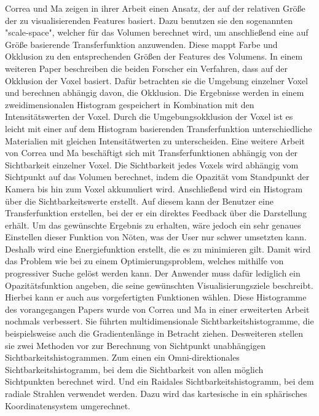 Correa und Ma zeigen in ihrer Arbeit \cite{correa2008size} einen Ansatz, der auf der relativen Größe der zu visualisierenden Features basiert.
\newline
Dazu benutzen sie den sogenannten "scale-space", welcher für das Volumen berechnet wird, um anschließend eine auf Größe basierende Transferfunktion anzuwenden. Diese mappt Farbe und Okklusion zu den entsprechenden Größen der Features des Volumens.
\newline
In einem weiteren Paper \cite{correa2009occlusion} beschreiben die beiden Forscher ein Verfahren, dass auf der Okklusion der Voxel basiert.
\newline
Dafür betrachten sie die Umgebung einzelner Voxel und berechnen abhängig davon, die Okklusion. Die Ergebnisse werden in einem zweidimensionalen Histogram gespeichert in Kombination mit den Intensitätswerten der Voxel. Durch die Umgebungsokklusion der Voxel ist es leicht mit einer auf dem Histogram basierenden Transferfunktion unterschiedliche Materialien mit gleichen Intensitätwerten zu unterscheiden.
\newline
Eine weitere Arbeit \cite{correa2009visibility} von Correa und Ma beschäftigt sich mit Transferfunktionen abhängig von der Sichtbarkeit einzelner Voxel.
\newline
Die Sichtbarkeit jedes Voxels wird abhängig vom Sichtpunkt auf das Volumen berechnet, indem die Opazität vom Standpunkt der Kamera bis hin zum Voxel akkumuliert wird. Anschließend wird ein Histogram über die Sichtbarkeitswerte erstellt. Auf diesem kann der Benutzer eine Transferfunktion erstellen, bei der er ein direktes Feedback über die Darstellung erhält. Um das gewünschte Ergebnis zu erhalten, wäre jedoch ein sehr genaues Einstellen dieser Funktion von Nöten, was der User nur schwer umsetzten kann. Deshalb wird eine Energiefunktion erstellt, die es zu minimieren gilt. Damit wird das Problem wie bei \cite{wu2007interactive}  zu einem Optimierungsproblem, welches mithilfe von progressiver Suche gelöst werden kann. Der Anwender muss dafür lediglich ein Opazitätsfunktion angeben, die seine gewünschten Visualisierungsziele beschreibt. Hierbei kann er auch aus vorgefertigten Funktionen wählen.
\newline
Diese Histogramme des vorangegangen Papers wurde von Correa und Ma in einer erweiterten Arbeit \cite{correa2011visibility} nochmals verbessert. Sie führten multidimensionale Sichtbarkeitshistogramme, die beispielsweise auch die Gradientenlänge in Betracht ziehen. Desweiteren stellen sie zwei Methoden vor zur Berechnung von Sichtpunkt unabhängigen Sichtbarkeitshistogrammen. Zum einen ein Omni-direktionales Sichtbarkeitshistogramm, bei dem die Sichtbarkeit von allen möglich Sichtpunkten berechnet wird. Und ein Raidales Sichtbarkeitshistogramm, bei dem radiale Strahlen verwendet werden. Dazu wird das kartesische in ein sphärisches Koordinatensystem umgerechnet.


